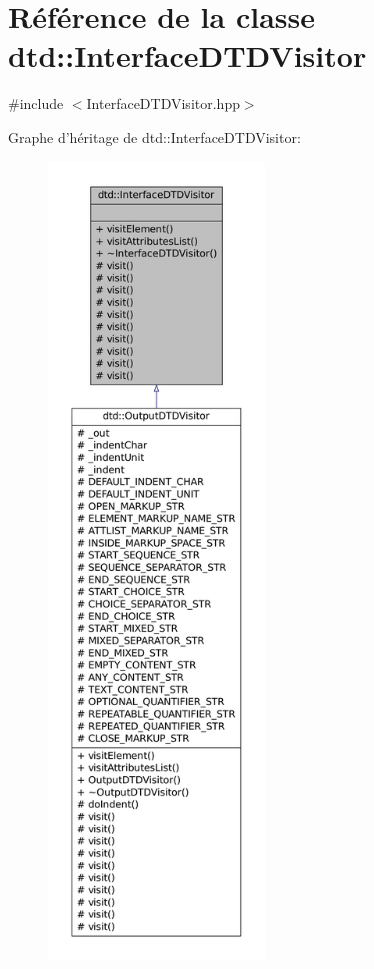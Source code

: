 \hypertarget{classdtd_1_1_interface_d_t_d_visitor}{
\section{Référence de la classe dtd::InterfaceDTDVisitor}
\label{classdtd_1_1_interface_d_t_d_visitor}
}


{\ttfamily \#include $<$InterfaceDTDVisitor.hpp$>$}



Graphe d'héritage de dtd::InterfaceDTDVisitor:\nopagebreak
\begin{figure}[H]
\begin{center}
\leavevmode
\includegraphics[height=600pt]{classdtd_1_1_interface_d_t_d_visitor__inherit__graph}
\end{center}
\end{figure}
